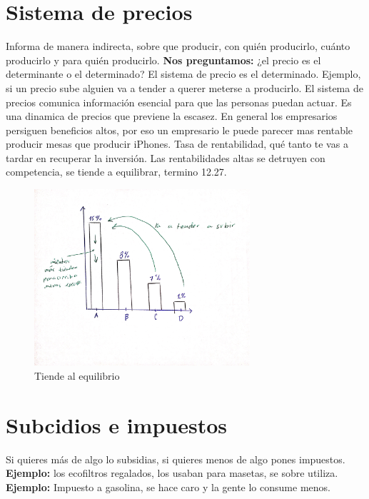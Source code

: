 \section{Sistema de precios}
Informa de manera indirecta, sobre que producir, con quién producirlo, cuánto producirlo y para quién producirlo. \textbf{Nos preguntamos:} ¿el precio es el determinante o el determinado? El sistema de precio es el determinado. Ejemplo, si un precio sube alguien va a tender a querer meterse a producirlo. El sistema de precios comunica información esencial para que las personas puedan actuar. Es una dinamica de precios que previene la escasez. En general los empresarios persiguen beneficios altos, por eso un empresario le puede parecer mas rentable producir mesas que producir iPhones. Tasa de rentabilidad, qué tanto te vas a tardar en recuperar la inversión. \newline 
Las rentabilidades altas se detruyen con competencia, se tiende a equilibrar, termino 12.27.
\begin{center}
\begin{figure}[htbp]
    \centering
    \includegraphics[width=8cm,angle=90]{Classes/Images/2019-07-24-4.jpg}
    \caption{Tiende al equilibrio}
    \label{fig4}
\end{figure}
\end{center}


\section{Subcidios e impuestos}
Si quieres más de algo lo subsidias, si quieres menos de algo pones impuestos. \textbf{Ejemplo: } los ecofiltros regalados, los usaban para masetas, se sobre utiliza. \newline 
\textbf{Ejemplo: } Impuesto a gasolina, se hace caro y la gente lo consume menos. 

